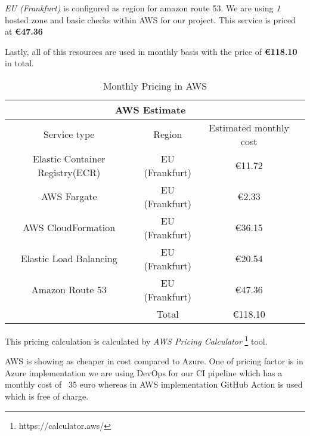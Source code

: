 \textit{EU (Frankfurt)} is configured as region for amazon route 53. We are using \textit{1} hosted zone and basic checks within AWS for our project. This service is priced at \textbf{€47.36}

Lastly, all of this resources are used in monthly basis with the price of \textbf{€118.10} in total.

\begin{table}[h!]
    \centering
    \begin{tabular}{ |c|c|c|c|  }
     \hline
     \multicolumn{3}{|c|}{AWS Estimate} \\
     \hline
     Service type & Region & Estimated monthly cost\\
     \hline
     Elastic Container Registry(ECR)  & EU (Frankfurt)   &   €11.72\\
     AWS Fargate&   EU (Frankfurt)  & €2.33\\
     AWS CloudFormation &EU (Frankfurt) & €36.15\\
     Elastic Load Balancing   &EU (Frankfurt) &  €20.54\\
     Amazon Route 53    &EU (Frankfurt) &  €47.36\\
     \hline
     \hline
     &    Total&€118.10\\
     \hline
    \end{tabular}
    \caption{Monthly Pricing in AWS}
    \label{tab:table_2}
\end{table}

This pricing calculation is calculated by \textit{AWS Pricing Calculator} \footnote{https://calculator.aws/} tool.

AWS is showing as cheaper in cost compared to Azure. One of pricing factor is in Azure implementation we are using DevOps for our CI pipeline which has a monthly cost of ~35 euro whereas in AWS implementation GitHub Action is used which is free of charge.